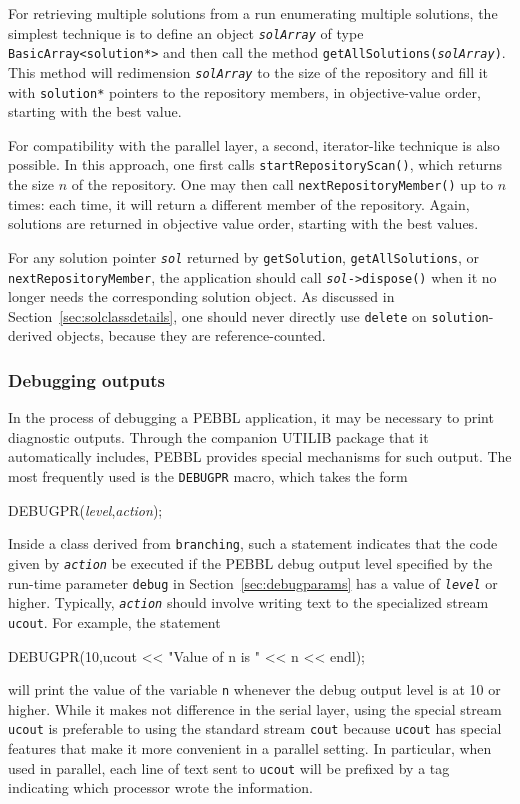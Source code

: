 For retrieving multiple solutions from a run enumerating multiple
solutions, the simplest technique is to define an object
\texttt{\emph{solArray}} of type \texttt{BasicArray<solution*>} and
then call the method \texttt{getAllSolutions(\emph{solArray})}.  This
method will redimension \texttt{\emph{solArray}} to the size of the
repository and fill it with \texttt{solution*} pointers to the
repository members, in objective-value order, starting with the best
value.

For compatibility with the parallel layer, a second, iterator-like
technique is also possible.  In this approach, one first calls
\texttt{startRepositoryScan()}, which returns the size $n$ of the
repository.  One may then call \texttt{nextRepositoryMember()} up to
$n$ times: each time, it will return a different member of the
repository.  Again, solutions are returned in objective value order,
starting with the best values.

For any solution pointer \emph{\texttt{sol}} returned by \texttt{getSolution},
\texttt{getAllSolutions}, or \texttt{next\-Repos\-itory\-Member}, the application
should call \texttt{\emph{sol}->dispose()} when it no longer needs the
corresponding solution object.  As discussed in
Section~\ref{sec:solclassdetails}, one should never directly use
\texttt{delete} on \texttt{solution}-derived objects, because they are
reference-counted.

\subsubsection{Debugging outputs}
In the process of debugging a PEBBL application, it may be necessary
to print diagnostic outputs.  Through the companion UTILIB package
that it automatically includes, PEBBL provides special mechanisms for
such output.  The most frequently used is the \texttt{DEBUGPR} macro,
which takes the form
\begin{codeblock}
DEBUGPR(\textit{level},\textit{action});
\end{codeblock}
Inside a class derived from \texttt{branching}, such a statement
indicates that the code given by \texttt{\textit{action}} be executed
if the PEBBL debug output level specified by the run-time parameter
\texttt{debug} in Section~\ref{sec:debugparams} has a value of
\texttt{\textit{level}} or higher.  Typically,
\texttt{\textit{action}} should involve writing text to the
specialized stream \texttt{ucout}.  For example, the statement
\begin{codeblock}
DEBUGPR(10,ucout << "Value of n is " << n << endl);
\end{codeblock}
will print the value of the variable \texttt{n} whenever the debug output
level is at 10 or higher.  While it makes not difference in the serial
layer, using the special stream \texttt{ucout} is preferable to using
the standard stream \texttt{cout} because \texttt{ucout} has special
features that make it more convenient in a parallel setting.  In
particular, when used in parallel, each line of text sent to
\texttt{ucout} will be prefixed by a tag indicating which processor
wrote the information.

